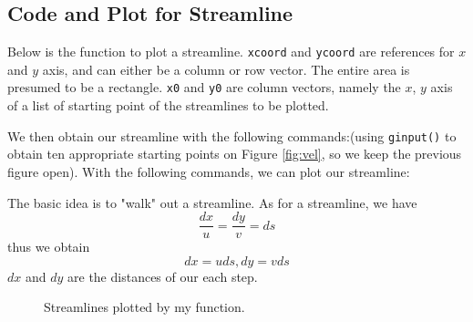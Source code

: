 \documentclass{article}
\begin{document}
  \subsection{Code and Plot for Streamline}
  Below is the function to plot a streamline. \texttt{xcoord} and \texttt{ycoord} are references for $x$ and $y$ axis, and can either be a column or row vector. The entire area is presumed to be a rectangle. \texttt{x0} and \texttt{y0} are column vectors, namely the $x$, $y$ axis of a list of starting point of the streamlines to be plotted.
  
  We then obtain our streamline with the following commands:(using \texttt{ginput()} to obtain ten appropriate starting points on Figure \ref{fig:vel}, so we keep the previous figure open). With the following commands, we can plot our streamline:
  
  The basic idea is to "walk" out a streamline. As for a streamline, we have
  $$\frac{dx}{u} = \frac{dy}{v} = ds$$ thus we obtain $$dx = uds, dy = vds$$ $dx$ and $dy$ are the distances of our each step.
  \begin{figure}[H]
    \centering
    \noindent{}
    \caption{Streamlines plotted by my function.} \label{fig:streamline}
  \end{figure}
\end{document}
